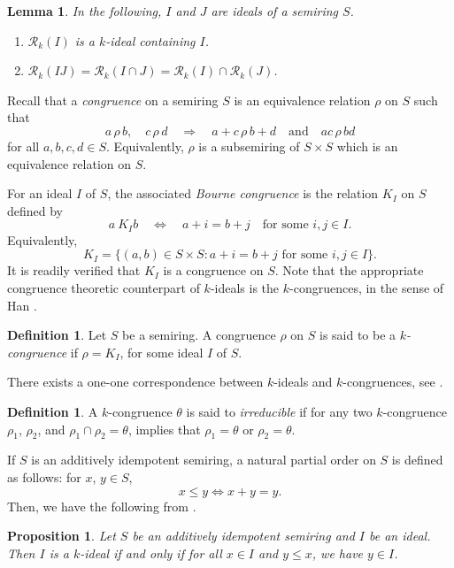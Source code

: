 \documentclass[11pt,leqno]{amsart}
\newtheorem{proposition}[theorem]{Proposition}
\newtheorem{lemma}[theorem]{Lemma}
\theoremstyle{definition}
\newtheorem{definition}[theorem]{Definition}
\numberwithin{equation}{section}
\begin{document}
\begin{lemma} In the following, $I$ and $J$ are ideals of a semiring $S$.
\begin{enumerate}
    \item $\mathcal{R}_k(I)$ is a $k$-ideal containing $I$.
    \item $\mathcal{R}_k(IJ)=\mathcal{R}_k(I\cap J)=\mathcal{R}_k(I)\cap \mathcal{R}_k(J)$.
\end{enumerate}
\end{lemma}
Recall that a \emph{congruence} on a semiring $S$ is an equivalence relation
$\rho$ on $S$ such that
\[
a\,\rho\,b,\quad c\,\rho\,d
\quad\Longrightarrow\quad
a+c\,\rho\,b+d
\quad\text{and}\quad
ac\,\rho\,bd
\]
for all $a,b,c,d\in S$. Equivalently, $\rho$ is a subsemiring of
$S\times S$ which is an equivalence relation on $S$.

For an ideal $I$ of $S$, the associated \emph{Bourne congruence} is the
relation $K_I$ on $S$ defined by
\[
a\ K_I b
\quad\Longleftrightarrow\quad
a+i=b+j
\quad\text{for some }i,j\in I.
\]
Equivalently,
\[
K_I
=
\{(a,b)\in S\times S:
a+i=b+j\text{ for some }i,j\in I\}.
\]
It is readily verified that $K_I$ is a congruence on $S$.
Note that the appropriate congruence theoretic counterpart of $k$-ideals is the $k$-congruences, in the sense of Han \cite[Definition 3.2]{Han21}. 

\begin{definition} \label{Def: k-congruence}
    Let $S$ be a semiring. A congruence $\rho$ on $S$ is said to be a \emph{$k$-congruence} if $\rho=K_I$, for some ideal $I$ of $S$.

\end{definition}

There exists a one-one correspondence between $k$-ideals and $k$-congruences, see \cite[Theorem 3.8]{Han21}.

\begin{definition}
    A $k$-congruence $\theta$ is said to \emph{irreducible} if for any two $k$-congruence $\rho_1$, $\rho_2$, and $\rho_1\cap \rho_2=\theta$, implies that $\rho_1=\theta$ or $\rho_2=\theta$.
\end{definition}

If $S$ is an additively idempotent semiring, a natural partial order on $S$ is defined as follows: for $x$, $y\in S$, \[x\leqslant y \Longleftrightarrow x+y=y.\]
Then, we have the following from \cite[Proposition 3.11]{JunRayTolliver22}. 

\begin{proposition}
    Let $S$ be an additively idempotent semiring and $I$ be an ideal. Then $I$ is a $k$-ideal if and only if for all $x\in I$ and $y\leqslant x$, we have $y\in I$.
\end{proposition}
\end{document}
